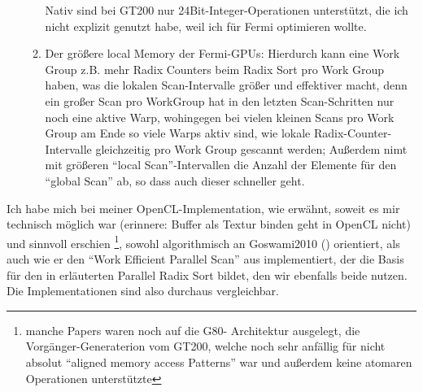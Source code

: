 \begin{enumerate}
\begin{enumerate}
			Nativ sind bei GT200 nur 24Bit-Integer-Operationen unterstützt, die ich nicht explizit genutzt habe, weil ich
			für Fermi optimieren wollte.
			\item Der größere local Memory der Fermi-GPUs:
				Hierdurch kann eine Work Group z.B. mehr Radix Counters beim Radix Sort pro Work Group haben, 
				was die lokalen Scan-Intervalle größer und effektiver macht, denn ein großer Scan pro WorkGroup 
				hat in den letzten Scan-Schritten nur noch eine aktive Warp, wohingegen bei vielen kleinen Scans pro Work 					Group am Ende so viele Warps aktiv sind, wie lokale Radix-Counter-Intervalle gleichzeitig pro Work Group 	
				gescannt werden; Außerdem nimt mit größeren "`local Scan"'-Intervallen die Anzahl der Elemente für den
				"`global Scan"' ab, so dass auch dieser schneller geht.
			\end{enumerate}	
	\end{enumerate}
	
	
	
	
	
	
	Ich habe mich bei meiner OpenCL-Implementation, wie erwähnt, soweit es mir technisch möglich war (erinnere: Buffer als
	Textur binden geht in OpenCL nicht) und sinnvoll erschien
	\footnote{manche Papers waren noch auf die G80- Architektur
		ausgelegt, die Vorgänger-Generaterion vom GT200, welche noch sehr anfällig für nicht absolut 
		"`aligned memory access Patterns"' war und außerdem keine atomaren Operationen unterstützte},
	sowohl algorithmisch an Goswami2010 (\cite{Goswami2010}) orientiert, als auch wie er den 
	"`Work Efficient Parallel Scan"' aus \cite{Harris2007} implementiert, der die Basis für den in \cite{Grand2008} 
	erläuterten Parallel Radix Sort bildet, den wir ebenfalls beide nutzen.
	Die Implementationen sind also durchaus vergleichbar.
	
